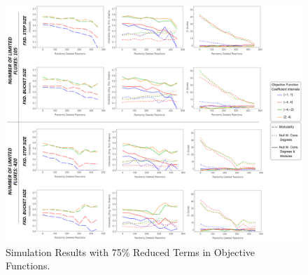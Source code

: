 \begin{landscape}
	\begin{figure}[ht]
		\centering
		\vspace*{-1.5cm}
		\includegraphics[width=1.05\hsize]{../images/supplements-obj_func_terms_reduced75-simulation-results.png}
		\caption{Simulation Results with 75\% Reduced Terms in Objective Functions.}
		\label{figure-supplements-obj_func-terms-reduced75}
	\end{figure}
\end{landscape}